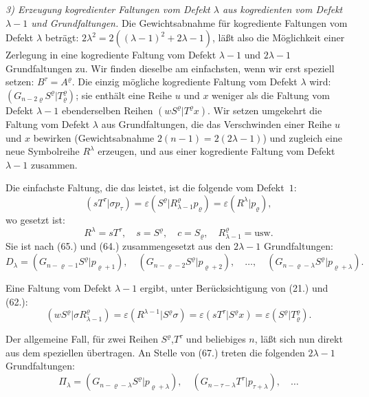 \documentclass[12pt,a4paper]{article}
\begin{document}
\textit{3) Erzeugung kogredienter Faltungen vom Defekt $\lambda$ aus kogredienten vom Defekt $\lambda-1$ und Grundfaltungen.} Die Gewichtsabnahme für kogrediente Faltungen vom Defekt $\lambda$ beträgt: $2\lambda^{2} = 2((\lambda-1)^{2} + 2\lambda - 1)$, läßt also die Möglichkeit einer Zerlegung in eine kogrediente Faltung vom Defekt $\lambda-1$ und $2\lambda-1$ Grundfaltungen zu. Wir finden dieselbe am einfachsten, wenn wir erst speziell setzen: $B^{\tau} = A^{\varrho}$. Die einzig mögliche kogrediente Faltung vom Defekt $\lambda$ wird: $(G_{n-2\varrho} S^{\varrho} | T^{\varrho}_{\varrho})$; sie enthält eine Reihe $u$ und $x$ weniger als die Faltung vom Defekt $\lambda-1$ ebenderselben Reihen $(w S^{\varrho} | T^{\varrho} x)$. Wir setzen umgekehrt die Faltung vom Defekt $\lambda$ aus Grundfaltungen, die das Verschwinden einer Reihe $u$ und $x$ bewirken (Gewichtsabnahme $2(n-1) = 2(2\lambda-1)$) und zugleich eine neue Symbolreihe $R^{\lambda}$ erzeugen, und aus einer kogrediente Faltung vom Defekt $\lambda-1$ zusammen.

Die einfachste Faltung, die das leistet, ist die folgende vom Defekt~$1$:
\begin{equation*}
(s T^{\tau} | \sigma p_{\tau}) = \varepsilon (S^{\varrho} | R^{\varrho}_{\lambda-1} p_{\varrho}) = \varepsilon (R^{\lambda} | p_{\varrho}),
\end{equation*}
wo gesetzt ist:
\begin{equation*}
R^{\lambda} = s T^{\tau}, \quad s = S^{\varrho}, \quad c = S_{\varrho}, \quad R^{\varrho}_{\lambda-1} = \text{usw.}
\end{equation*}
Sie ist nach (65.) und (64.) zusammengesetzt aus den $2\lambda-1$ Grundfaltungen:
\begin{equation}\tag{67}
D_{\lambda} = (G_{n-\varrho-1} S^{\varrho} | p_{\varrho+1}), \quad (G_{n-\varrho-2} S^{\varrho} | p_{\varrho+2}), \quad \ldots, \quad (G_{n-\varrho-\lambda} S^{\varrho} | p_{\varrho+\lambda}).
\end{equation}

Eine Faltung vom Defekt $\lambda-1$ ergibt, unter Berücksichtigung von (21.) und (62.):
\begin{equation*}
(w S^{\varrho} | \sigma R^{\varrho}_{\lambda-1}) = \varepsilon (R^{\lambda-1} | S^{\varrho} \sigma) = \varepsilon (s T^{\tau} | S^{\varrho} x) = \varepsilon (S^{\varrho} | T^{\varrho}_{\varrho}).
\end{equation*}

Der allgemeine Fall, für zwei Reihen $S^{\varrho}$,$T^{\tau}$ und beliebiges $n$, läßt sich nun direkt aus dem speziellen übertragen. An Stelle von (67.) treten die folgenden $2\lambda-1$ Grundfaltungen:
\begin{equation}\tag{68}
\Pi_{\lambda} = (G_{n-\varrho-\lambda} S^{\varrho} | p_{\varrho+\lambda}), \quad (G_{n-\tau-\lambda} T^{\tau} | p_{\tau+\lambda}), \quad \ldots
\end{equation}
\end{document}
